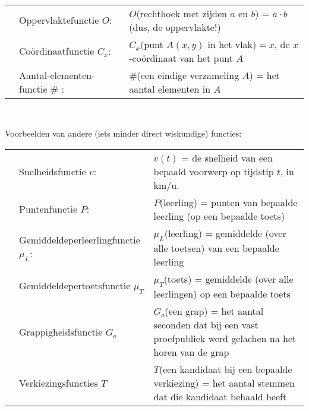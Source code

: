 \documentclass{ximera}
\begin{document}
\\
\begin{tabular}[t]{l l l}
    & Oppervlaktefunctie $O$:    & $O$(rechthoek met zijden $a$ en $b$) = $a\cdot b$ (dus, de oppervlakte!) \\
    & Coördinaatfunctie $C_x$\footnotemark[3]:     & $C_x($punt $A(x,y) $ in het vlak$) = x$, de $x$-coördinaat van het punt $A$  \\
    & Aantal-elementen-functie \# \footnotemark[4]: & \#(een eindige verzameling $A$) = het aantal elementen in $A$
\end{tabular}
\\

Voorbeelden van andere (iets minder direct wiskundige) functies:
\\
\begin{tabular}{l l p{10cm}}
    & Snelheidsfunctie $v$:     & $v(t)$ = de snelheid van een bepaald voorwerp op tijdstip $t$, in km/u.  \\    
    & Puntenfunctie $P$:        & $P$(leerling) = punten van bepaalde leerling (op een bepaalde toets)  \\
    & Gemiddeldeperleerlingfunctie $\mu_L$: & $\mu_L$(leerling) = gemiddelde (over alle toetsen) van een bepaalde leerling  \\
    & Gemiddeldepertoetsfunctie $\mu_T$ & $\mu_T$(toets) = gemiddelde (over alle leerlingen) op een bepaalde toets \\
    & Grappigheidsfunctie $G_o$  & $G_o$(een grap) = het aantal seconden dat bij een vast proefpubliek  werd gelachen na het horen van de grap \\
    & Verkiezingsfuncties $T$   & $T$(een kandidaat bij een bepaalde verkiezing) =  het aantal stemmen dat die kandidaat behaald heeft \\
\end{tabular}
\end{document}
